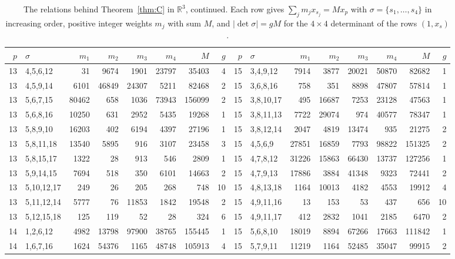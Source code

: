 \begin{table}[tp]
\scriptsize
\caption{The relations behind Theorem~\ref{thm:C} in $\mathbb{R}^3$, continued. Each row gives $\sum_j m_j x_{s_j}=M x_p$ with $\sigma=\{s_1,\dots,s_4\}$ in increasing order, positive integer weights $m_j$ with sum $M$, and $|\det\sigma|=gM$ for the $4\times4$ determinant of the rows $(1,x_s)$.}\label{tab:certCthreeb}
\begin{ruledtabular}
\begin{tabular}{rlrrrrrr@{\hspace{2.2em}}rlrrrrrr}
$p$ & $\sigma$ & $m_1$ & $m_2$ & $m_3$ & $m_4$ & $M$ & $g$ & $p$ & $\sigma$ & $m_1$ & $m_2$ & $m_3$ & $m_4$ & $M$ & $g$ \\ \hline
13 & 4,5,6,12 & 31 & 9674 & 1901 & 23797 & 35403 & 4 & 15 & 3,4,9,12 & 7914 & 3877 & 20021 & 50870 & 82682 & 1 \\
13 & 4,5,9,14 & 6101 & 46849 & 24307 & 5211 & 82468 & 2 & 15 & 3,6,8,16 & 758 & 351 & 8898 & 47807 & 57814 & 1 \\
13 & 5,6,7,15 & 80462 & 658 & 1036 & 73943 & 156099 & 2 & 15 & 3,8,10,17 & 495 & 16687 & 7253 & 23128 & 47563 & 1 \\
13 & 5,6,8,16 & 10250 & 631 & 2952 & 5435 & 19268 & 1 & 15 & 3,8,11,13 & 7722 & 29074 & 974 & 40577 & 78347 & 1 \\
13 & 5,8,9,10 & 16203 & 402 & 6194 & 4397 & 27196 & 1 & 15 & 3,8,12,14 & 2047 & 4819 & 13474 & 935 & 21275 & 2 \\
13 & 5,8,11,18 & 13540 & 5895 & 916 & 3107 & 23458 & 3 & 15 & 4,5,6,9 & 27851 & 16859 & 7793 & 98822 & 151325 & 2 \\
13 & 5,8,15,17 & 1322 & 28 & 913 & 546 & 2809 & 1 & 15 & 4,7,8,12 & 31226 & 15863 & 66430 & 13737 & 127256 & 1 \\
13 & 5,9,14,15 & 7694 & 518 & 350 & 6101 & 14663 & 2 & 15 & 4,7,9,13 & 17886 & 3884 & 41348 & 9323 & 72441 & 2 \\
13 & 5,10,12,17 & 249 & 26 & 205 & 268 & 748 & 10 & 15 & 4,8,13,18 & 1164 & 10013 & 4182 & 4553 & 19912 & 4 \\
13 & 5,11,12,14 & 5777 & 76 & 11853 & 1842 & 19548 & 2 & 15 & 4,9,11,16 & 13 & 153 & 53 & 437 & 656 & 10 \\
13 & 5,12,15,18 & 125 & 119 & 52 & 28 & 324 & 6 & 15 & 4,9,11,17 & 412 & 2832 & 1041 & 2185 & 6470 & 2 \\
14 & 1,2,6,12 & 4982 & 13798 & 97900 & 38765 & 155445 & 1 & 15 & 5,6,8,10 & 18019 & 8894 & 67266 & 17663 & 111842 & 1 \\
14 & 1,6,7,16 & 1624 & 54376 & 1165 & 48748 & 105913 & 4 & 15 & 5,7,9,11 & 11219 & 1164 & 52485 & 35047 & 99915 & 2 \\

\end{tabular}
\end{ruledtabular}
\end{table}
